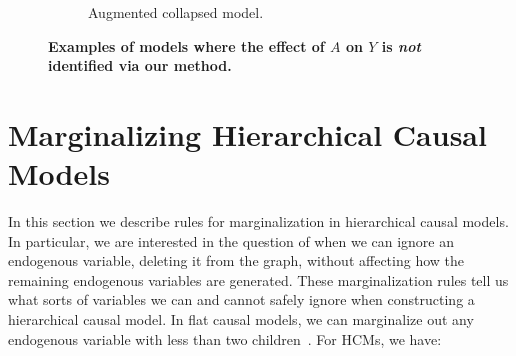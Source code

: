 \documentclass[12pt]{article}
\begin{document}
\begin{figure}[t!]
\begin{subfigure}[t]{0.35\textwidth}
\begin{tikzpicture}
\end{tikzpicture}
\end{subfigure}
\begin{subfigure}[t]{0.35\textwidth}
\caption{Augmented collapsed model.} \label{fig:nonID_ex2u}
\centering
{}
\end{subfigure}
\caption{\textbf{Examples of models where the effect of $A$ on $Y$ is \textit{not} identified via our method.} } \label{fig:nonID_exs}
\end{figure}  \section{Marginalizing Hierarchical Causal Models} \label{appx:marginalization}

In this section we describe rules for marginalization in hierarchical causal models.
In particular, we are interested in the question of when we can ignore an endogenous variable, deleting it from the graph, without affecting how the remaining endogenous variables are generated.
These marginalization rules tell us what sorts of variables we can and cannot safely ignore when constructing a hierarchical causal model.
In flat causal models, we can marginalize out any endogenous variable with less than two children~\citep[e.g.][Chap. 9]{Richardson2002-sp,Janzing2022-rn,Peters2017-ww}. For HCMs, we have:
\end{document}
